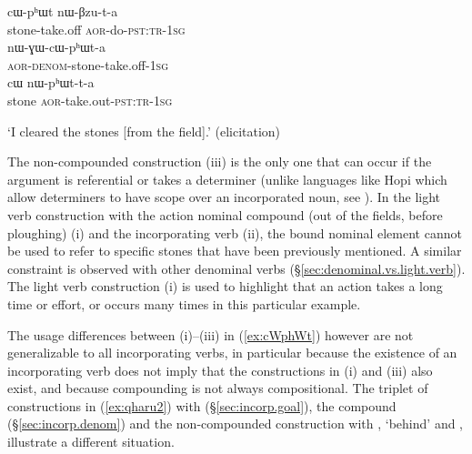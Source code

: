 \begin{exe}
\ex \label{ex:cWphWt}
\begin{xlist}[(ii)]
\gll  cɯ-pʰɯt nɯ-βzu-t-a  \\
  stone-take.off \textsc{aor}-do-\textsc{pst}:\textsc{tr}-\textsc{1sg} \\
\gll nɯ-ɣɯ-cɯ-pʰɯt-a \\
\textsc{aor}-\textsc{denom}-stone-take.off-\textsc{1sg} \\
\gll cɯ nɯ-pʰɯt-t-a  \\
  stone \textsc{aor}-take.out-\textsc{pst}:\textsc{tr}-\textsc{1sg} \\
\end{xlist}
\glt `I cleared the stones [from the field].' (elicitation)
\end{exe}   

The non-compounded construction (iii) is the only one that can occur if the argument is referential or takes a determiner (unlike languages like Hopi which allow determiners to have scope over an incorporated noun, see \citealt{hill.kc03hopi, haugen08incorp}). In the light verb construction with the action nominal compound  (out of the fields, before ploughing) (i) and the incorporating verb  (ii), the bound nominal element  cannot be used to refer to specific stones that have been previously mentioned. A similar constraint is observed with other denominal verbs (§\ref{sec:denominal.vs.light.verb}). The light verb construction (i) is used to highlight that an action takes a long time or effort, or occurs many times in this particular example. 

The usage differences between (i)--(iii) in (\ref{ex:cWphWt}) however are not generalizable to all incorporating verbs, in particular because the existence of an incorporating verb does not imply that the constructions in (i) and (iii) also exist, and because compounding is not always compositional. The triplet of constructions in (\ref{ex:qharu2}) with  (§\ref{sec:incorp.goal}), the compound  (§\ref{sec:incorp.denom}) and the non-compounded construction with  , `behind' and , illustrate a different situation.

